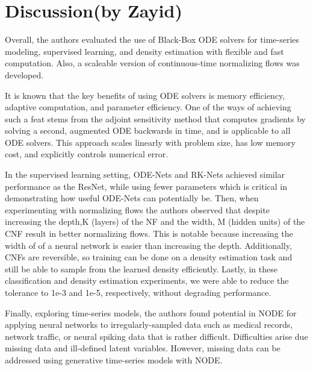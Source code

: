 \documentclass{article}
\begin{document}
\section{Discussion(by Zayid)}
\label{sec:discussion}
Overall, the authors evaluated the use of Black-Box ODE solvers for time-series modeling, supervised learning, and density estimation with flexible and fast computation. Also, a scaleable version of continuous-time normalizing flows was developed.

It is known that the key benefits of using ODE solvers is memory efficiency, adaptive computation, and parameter efficiency. One of the ways of achieving such a feat stems from the adjoint sensitivity method that computes gradients by solving a second, augmented ODE backwards in time, and is applicable to all ODE solvers. This approach scales linearly with problem size, has low memory cost, and explicitly controls numerical error.

In the supervised learning setting, ODE-Nets and RK-Nets achieved similar performance as the ResNet, while using fewer parameters which is critical in demonstrating how useful ODE-Nets can potentially be. Then, when experimenting with normalizing flows the authors observed that despite increasing the depth,K (layers) of the NF  and the width, M (hidden units) of the CNF result in better normalizing flows. This is notable because increasing the width of of a neural network is easier than increasing the depth.
Additionally, CNFs are reversible, so training can be done on a density estimation task and still be able to sample from the learned density efficiently. Lastly, in these classification and density estimation experiments, we were able to reduce the tolerance to 1e-3 and 1e-5, respectively, without degrading performance.

Finally, exploring time-series models, the authors found potential in NODE for applying neural networks to irregularly-sampled data such as medical records, network traffic, or neural spiking data that is rather difficult. Difficulties arise due missing data and ill-defined latent variables. However, missing data can be addressed using generative time-series models with NODE.
\end{document}
